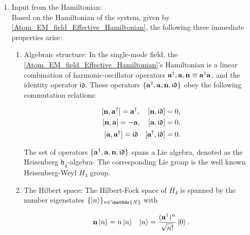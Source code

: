 \documentclass{homework}
\begin{document}
\begin{enumerate}
    \item Input from the Hamiltonian: \\
          Based on the Hamiltonian of the system, given by \cref{Atom_EM_field_Effective_Hamiltonian}, the following three immediate properties arise:
          
          \begin{enumerate}
              \item Algebraic structure: In the single-mode field, the \cref{Atom_EM_field_Effective_Hamiltonian}'s Hamiltonian is a linear combination of harmonic-oscillator operators ${\bf a}^\dagger, {\bf a}, {\bf n} \equiv {\bf a}^\dagger {\bf a}$, and the identity operator ${\mathfrak{i}\mathfrak{d}}$. These operators $\{{\bf a}^\dagger, {\bf a}, {\bf n}, \mathfrak{i}\mathfrak{d}\}$ obey the following commutation relations:
              
              \begin{equation}
              \begin{split}
                  [{\bf n}, {\bf a}^\dagger] = {\bf a}^\dagger, \quad [{\bf n}, \mathfrak{i}\mathfrak{d}] = 0,  \\
                  [{\bf n}, {\bf a}] = - {\bf a}, \quad [{\bf a}, \mathfrak{i}\mathfrak{d}] = 0,  \\
                  [{\bf a}, {\bf a}^\dagger] = \mathfrak{i}\mathfrak{d} \quad [{\bf a}^\dagger, \mathfrak{i}\mathfrak{d}] = 0.  \\
              \end{split}
              \end{equation}
              
              The set of operators $\{{\bf a}^\dagger, {\bf a}, {\bf n}, \mathfrak{i}\mathfrak{d}\}$ spans a Lie algebra, denoted as the Heisenberg $\mathfrak{h}_4$-algebra- The corresponding Lie group is the well known Heisenberg-Weyl $H_4$ group. \\
              
              \item The Hilbert space: The Hilbert-Fock space of $H_4$       is spanned by the number eigenstates            $\{\ket{n}\}_{n \in \mathds{N}}$ with 
                    
                    \begin{align}
                        {\bf n} \ket{n} &= n \ket{n} & \ket{n} = \frac{({\bf a}^\dagger)^n}{\sqrt{n!}} \ket{0}.
                    \end{align}
                    

\end{enumerate}
\end{enumerate}
\end{document}
